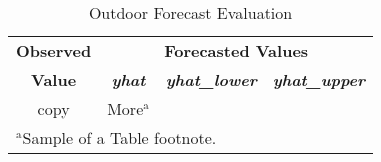 \documentclass[conference]{IEEEtran}
\begin{document}
\begin{table}[htbp]
\caption{Outdoor Forecast Evaluation}
\begin{center}
\begin{tabular}{|c|c|c|c|}
\hline
\textbf{Observed}&\multicolumn{3}{|c|}{\textbf{Forecasted Values}} \\
\cline{2-4} 
\textbf{Value} & \textbf{\textit{yhat}}& \textbf{\textit{yhat\_lower}}& \textbf{\textit{yhat\_upper}} \\
\hline
copy& More$^{\mathrm{a}}$& &  \\
\hline
\multicolumn{4}{l}{$^{\mathrm{a}}$Sample of a Table footnote.}
\end{tabular}
\label{tab_forecast_outdoor}
\end{center}
\end{table}
\end{document}
